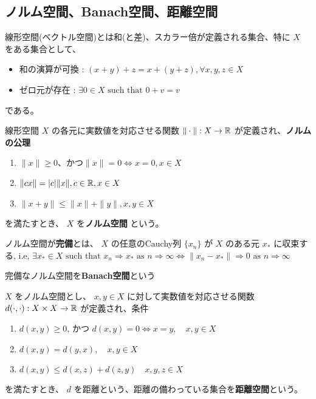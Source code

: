 

%

\subsection{ノルム空間、Banach空間、距離空間}

\begin{df}
線形空間(ベクトル空間)とは和(と差)、スカラー倍が定義される集合、特に $X$ をある集合として、
\begin{itemize}
\item 和の演算が可換 : $(x+y)+z = x+(y+z), \forall x,y,z \in X$
\item ゼロ元が存在 : $\exists0 \in X \mbox{ such that } 0 + v = v$ 
\end{itemize}
である。
\end{df}

\begin{df}
線形空間 $X$ の各元に実数値を対応させる関数 $\|\cdot\| : X \rightarrow \mathbb{R}$ が定義され、\textbf{ノルムの公理}
\begin{enumerate}
\item $\|x\| \ge 0 \mbox{、かつ} \|x\| = 0 \Leftrightarrow x = 0,x \in X$
\item $\|cx\| = |c|\|x\|, c \in \mathbb{R}, x \in X$
\item $\|x+y\| \leq \|x\| + \|y\|, x,y \in X$
\end{enumerate}
を満たすとき、 $X$ を\textbf{ノルム空間} という。
\end{df}

ノルム空間が\textbf{完備}とは、 $X$ の任意のCauchy列 $\{ x_n \}$ が $X$ のある元 $x_*$ に収束する, i.e, $\exists x_* \in X \mbox{ such that } x_n \Rightarrow x_* \mbox{ as } n \Rightarrow \infty \Leftrightarrow \|x_n - x_* \| \Rightarrow 0  \mbox{ as } n \Rightarrow \infty$

\begin{df}
完備なノルム空間を\textbf{Banach空間}という
\end{df}

\begin{df}
$X$ をノルム空間とし、 $x,y \in X$ に対して実数値を対応させる関数 $d(\cdot, \cdot) :X \times X \to \mathbb{R}$ が定義され、条件
\begin{enumerate}
\item $d(x,y) \ge 0$, かつ $d(x,y) = 0 \Leftrightarrow x = y, \quad x,y \in X$
\item $d(x,y) = d(y,x), \quad x,y \in X$
\item $d(x,y) \leq d(x,z) + d(z,y) \quad x,y,z \in X$
\end{enumerate}
を満たすとき、 $d$ を距離という、距離の備わっている集合を\textbf{距離空間}という。
\end{df}

